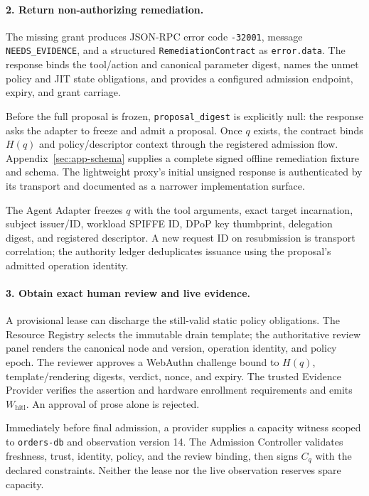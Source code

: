 \paragraph{2. Return non-authorizing remediation.}
The missing grant produces JSON-RPC error code \texttt{-32001}, message \texttt{NEEDS\_EVIDENCE}, and a structured \texttt{RemediationContract} as \texttt{error.data}. The response binds the tool/action and canonical parameter digest, names the unmet policy and JIT state obligations, and provides a configured admission endpoint, expiry, and grant carriage.

Before the full proposal is frozen, \texttt{proposal\_digest} is explicitly null: the response asks the adapter to freeze and admit a proposal. Once $q$ exists, the contract binds $H(q)$ and policy/descriptor context through the registered admission flow. Appendix~\ref{sec:app-schema} supplies a complete signed offline remediation fixture and schema. The lightweight proxy's initial unsigned response is authenticated by its transport and documented as a narrower implementation surface.

The Agent Adapter freezes $q$ with the tool arguments, exact target incarnation, subject issuer/ID, workload SPIFFE ID, DPoP key thumbprint, delegation digest, and registered descriptor. A new request ID on resubmission is transport correlation; the authority ledger deduplicates issuance using the proposal's admitted operation identity.

\paragraph{3. Obtain exact human review and live evidence.}
A provisional lease can discharge the still-valid static policy obligations. The Resource Registry selects the immutable drain template; the authoritative review panel renders the canonical node and version, operation identity, and policy epoch. The reviewer approves a WebAuthn challenge bound to $H(q)$, template/rendering digests, verdict, nonce, and expiry. The trusted Evidence Provider verifies the assertion and hardware enrollment requirements and emits $W_{\mathrm{hitl}}$. An approval of prose alone is rejected.

Immediately before final admission, a provider supplies a capacity witness scoped to \texttt{orders-db} and observation version 14. The Admission Controller validates freshness, trust, identity, policy, and the review binding, then signs $C_q$ with the declared constraints. Neither the lease nor the live observation reserves spare capacity.

